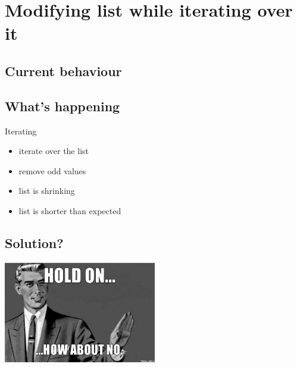 \documentclass{beamer}
\begin{document}
\section{Modifying list while iterating over it}
\subsection{Current behaviour}
\begin{frame}
\begin{center}
\structure{\insertsection}
\end{center}

\pause 
\end{frame}

\subsection{What's happening}
\begin{frame}
Iterating
\begin{itemize}
\item iterate over the list
\item remove odd values
\item list is shrinking
\item list is shorter than expected
\end{itemize}
\end{frame}

\subsection{Solution?}
\begin{frame}

\pause
\begin{center}
\includegraphics[width=0.5\textwidth]{images/nope.jpg}
\end{center}
\end{frame}
\begin{frame}

\end{frame}
\end{document}
